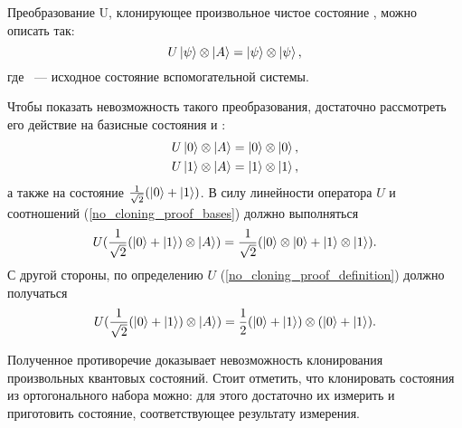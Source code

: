 Преобразование U, клонирующее произвольное чистое состояние \state{\psi}, можно описать так:
\begin{equation}\label{no_cloning_proof_definition}
  U\left| \psi \right\rangle\otimes\left| A \right\rangle = \left| \psi \right\rangle\otimes\left| \psi \right\rangle,  
\end{equation}
где ~--- исходное состояние вспомогательной системы.

Чтобы показать невозможность такого преобразования, достаточно рассмотреть его действие на базисные состояния  и :
\begin{eqnarray}\label{no_cloning_proof_bases}
  U\left| 0 \right\rangle\otimes\left| A \right\rangle = \left| 0 \right\rangle\otimes\left| 0 \right\rangle, \nonumber\\
  U\left| 1 \right\rangle\otimes\left| A \right\rangle = \left| 1 \right\rangle\otimes\left| 1 \right\rangle,
\end{eqnarray}
а также на состояние $\frac{1}{\sqrt{2}}(\left| 0 \right\rangle + \left| 1 \right\rangle)$. В силу линейности оператора $U$ и соотношений (\ref{no_cloning_proof_bases}) должно выполняться
\begin{equation}U(\frac{1}{\sqrt{2}}(\left| 0 \right\rangle + \left| 1 \right\rangle) \otimes \left| A \right\rangle) = \frac{1}{\sqrt{2}}(\left| 0 \right\rangle \otimes \left| 0 \right\rangle + \left| 1 \right\rangle \otimes \left| 1 \right\rangle).\end{equation}
С другой стороны, по определению $U$ (\ref{no_cloning_proof_definition}) должно получаться
\begin{equation}U(\frac{1}{\sqrt{2}}(\left| 0 \right\rangle + \left| 1 \right\rangle) \otimes \left| A \right\rangle) = \frac{1}{2}(\left| 0 \right\rangle + \left| 1 \right\rangle) \otimes (\left| 0 \right\rangle + \left| 1 \right\rangle).\end{equation}

Полученное противоречие доказывает невозможность клонирования произвольных квантовых состояний. Стоит отметить, что клонировать состояния из ортогонального набора можно: для этого достаточно их измерить и приготовить состояние, соответствующее результату измерения.